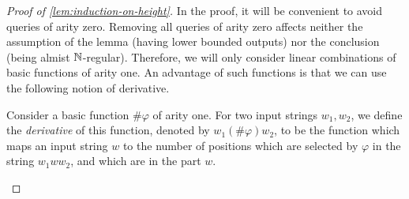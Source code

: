 \begin{proof}[Proof of \cref{lem:induction-on-height}]
In the proof, it will be convenient to avoid queries of arity zero. Removing all queries of arity zero affects neither the assumption of the lemma (having lower bounded outputs)  nor the conclusion (being almist ${\mathbb N}$-regular). Therefore, we will only consider linear combinations of basic functions of arity one.
An advantage of such functions is that we can use the following notion of derivative. 

\begin{definition}[Derivative]
    Consider a basic function $\#\varphi$ of arity one. For two input strings $w_1, w_2$, we define the \emph{derivative} of this function, denoted by $w_1 (\#\varphi) w_2$, to be the function which maps an input string $w$ to the number of positions which are selected by $\varphi$ in the string $w_1 w w_2$, and which are in the part $w$.
\end{definition}







\end{proof}
